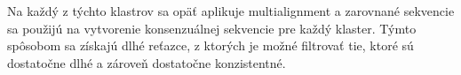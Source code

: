 Na každý z týchto klastrov sa opäť aplikuje multialignment a zarovnané sekvencie sa použijú na vytvorenie konsenzuálnej sekvencie pre každý klaster.
Týmto spôsobom sa získajú dlhé reťazce, z ktorých je možné filtrovať tie, ktoré sú dostatočne dlhé a zároveň dostatočne konzistentné.
